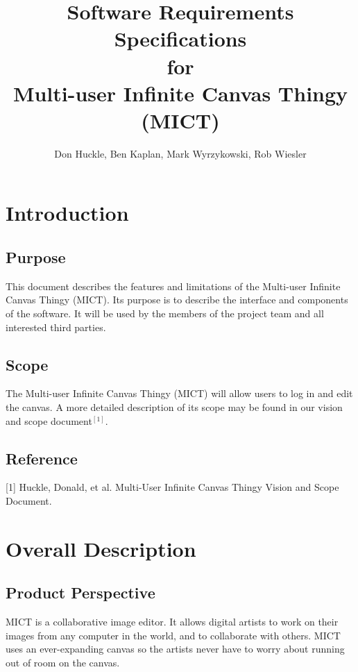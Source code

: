 \documentclass[11pt,oneside,a4paper]{article}
\title{Software Requirements Specifications \\ for \\ Multi-user Infinite Canvas Thingy (MICT)}
\author{Don Huckle, Ben Kaplan, Mark Wyrzykowski, Rob Wiesler}
\begin{document}
\maketitle
\tableofcontents
\pagebreak

\section{Introduction}
\subsection{Purpose}
This document describes the features and limitations of the Multi-user Infinite Canvas Thingy (MICT). Its purpose is to describe the interface and components of the software. It will be used by the members of the project team and all interested third parties.
\subsection{Scope}
The Multi-user Infinite Canvas Thingy (MICT) will allow users to log in and edit the canvas.  A more detailed description of its scope may be found in our vision and scope document$^{[1]}$. 
\subsection{Reference}
[1] Huckle, Donald, et al. Multi-User Infinite Canvas Thingy Vision and Scope Document.

\section{Overall Description}
\subsection{Product Perspective}
MICT is a collaborative image editor. It allows digital artists to work on their images from any computer in the world, and to collaborate with others. MICT uses an ever-expanding canvas so the artists never have to worry about running out of room on the canvas. 
\end{document}
